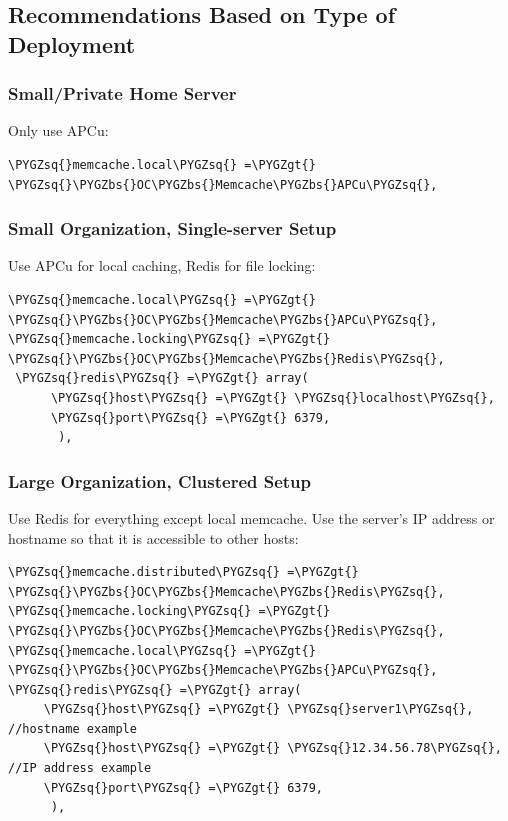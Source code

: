 \documentclass[letterpaper,10pt,english]{sphinxmanual}
\def\PYGZbs{\char`\\}
\def\PYGZgt{\char`\>}
\def\PYGZsq{\char`\'}
\begin{document}
\subsection{Recommendations Based on Type of Deployment}
\label{configuration_server/caching_configuration:recommendations-based-on-type-of-deployment}

\subsubsection{Small/Private Home Server}
\label{configuration_server/caching_configuration:small-private-home-server}
Only use APCu:

\begin{Verbatim}[commandchars=\\\{\}]
\PYGZsq{}memcache.local\PYGZsq{} =\PYGZgt{} \PYGZsq{}\PYGZbs{}OC\PYGZbs{}Memcache\PYGZbs{}APCu\PYGZsq{},
\end{Verbatim}


\subsubsection{Small Organization, Single-server Setup}
\label{configuration_server/caching_configuration:small-organization-single-server-setup}
Use APCu for local caching, Redis for file locking:

\begin{Verbatim}[commandchars=\\\{\}]
\PYGZsq{}memcache.local\PYGZsq{} =\PYGZgt{} \PYGZsq{}\PYGZbs{}OC\PYGZbs{}Memcache\PYGZbs{}APCu\PYGZsq{},
\PYGZsq{}memcache.locking\PYGZsq{} =\PYGZgt{} \PYGZsq{}\PYGZbs{}OC\PYGZbs{}Memcache\PYGZbs{}Redis\PYGZsq{},
 \PYGZsq{}redis\PYGZsq{} =\PYGZgt{} array(
      \PYGZsq{}host\PYGZsq{} =\PYGZgt{} \PYGZsq{}localhost\PYGZsq{},
      \PYGZsq{}port\PYGZsq{} =\PYGZgt{} 6379,
       ),
\end{Verbatim}


\subsubsection{Large Organization, Clustered Setup}
\label{configuration_server/caching_configuration:large-organization-clustered-setup}
Use Redis for everything except local memcache. Use the server's IP address or hostname so that it is accessible to other hosts:

\begin{Verbatim}[commandchars=\\\{\}]
\PYGZsq{}memcache.distributed\PYGZsq{} =\PYGZgt{} \PYGZsq{}\PYGZbs{}OC\PYGZbs{}Memcache\PYGZbs{}Redis\PYGZsq{},
\PYGZsq{}memcache.locking\PYGZsq{} =\PYGZgt{} \PYGZsq{}\PYGZbs{}OC\PYGZbs{}Memcache\PYGZbs{}Redis\PYGZsq{},
\PYGZsq{}memcache.local\PYGZsq{} =\PYGZgt{} \PYGZsq{}\PYGZbs{}OC\PYGZbs{}Memcache\PYGZbs{}APCu\PYGZsq{},
\PYGZsq{}redis\PYGZsq{} =\PYGZgt{} array(
     \PYGZsq{}host\PYGZsq{} =\PYGZgt{} \PYGZsq{}server1\PYGZsq{},  //hostname example
     \PYGZsq{}host\PYGZsq{} =\PYGZgt{} \PYGZsq{}12.34.56.78\PYGZsq{},  //IP address example
     \PYGZsq{}port\PYGZsq{} =\PYGZgt{} 6379,
      ),
\end{Verbatim}
\end{document}

